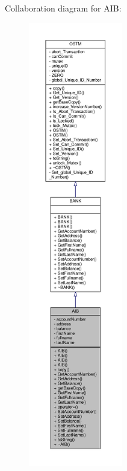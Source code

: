 Collaboration diagram for A\+IB\+:
\nopagebreak
\begin{figure}[H]
\begin{center}
\leavevmode
\includegraphics[height=550pt]{class_a_i_b__coll__graph}
\end{center}
\end{figure}
